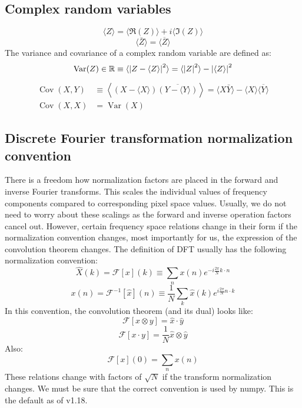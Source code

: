 \subsection{Complex random variables}
%
\begin{equation}
\langle Z\rangle = \langle\Re(Z)\rangle + i\langle\Im(Z)\rangle
\end{equation}
%
\begin{equation}
\langle \bar{Z}\rangle = \overline{\langle Z\rangle}
\end{equation}
%
\newcommand{\Var}{\mathrm{Var}}
%
The variance and covariance of a complex random variable are defined as:
\begin{equation}
\operatorname{Var}(Z) \in \mathbb{R} \equiv \langle\abs{Z-\langle Z \rangle}^2 \rangle =
\langle\abs{Z}^2\rangle - \abs{\langle Z \rangle}^2
\end{equation}
%
\begin{align}
\operatorname{Cov}(X, Y) &\equiv \left\langle\left(X - \langle X \rangle\right)
\overline{\left(Y - \langle Y \rangle\right)} \right\rangle
= \langle X\bar{Y} \rangle - \langle X \rangle \overline{\langle Y \rangle} \\
\operatorname{Cov}(X, X) &= \operatorname{Var}(X)
\end{align}
%
\subsection{Discrete Fourier transformation normalization convention}
\par There is a freedom how normalization factors are placed in the
forward and inverse Fourier transforms.  This scales the individual
values of frequency components compared to corresponding pixel space
values. Usually, we do not need to worry about these scalings as the
forward and inverse operation factors cancel out. However, certain
frequency space relations change in their form if the normalization
convention changes, most importantly for us, the expression of the
convolution theorem changes.
%
The definition of DFT usually has the following normalization convention:
\begin{equation}
\hat{X}(k) = \mathcal{F}[x](k) \equiv \sum_n x(n) e^{-i\frac{2\pi}{N}k\cdot n}
\end{equation}
%
\begin{equation}
x(n) = \mathcal{F}^{-1}[\hat{x}](n) \equiv \frac{1}{N}\sum_k \hat{x}(k)
  e^{i\frac{2\pi}{N}n\cdot k}
\end{equation}
In this convention, the convolution theorem (and its dual) looks like:
\begin{equation}
\mathcal{F}[x \otimes y] =  \hat{x} \cdot \hat{y}
\end{equation}
\begin{equation}
\mathcal{F}[x\cdot y] = \frac{1}{N} \hat{x} \otimes \hat{y}
\end{equation}
Also:
\begin{equation}
\mathcal{F}[x](0) = \sum_n x(n)
\label{eq:X0sum}
\end{equation}
These relations change with factors of $\sqrt{N}$ if the transform
normalization changes. We must be sure that the correct convention is used
by numpy. This is the default as of v1.18.
%
